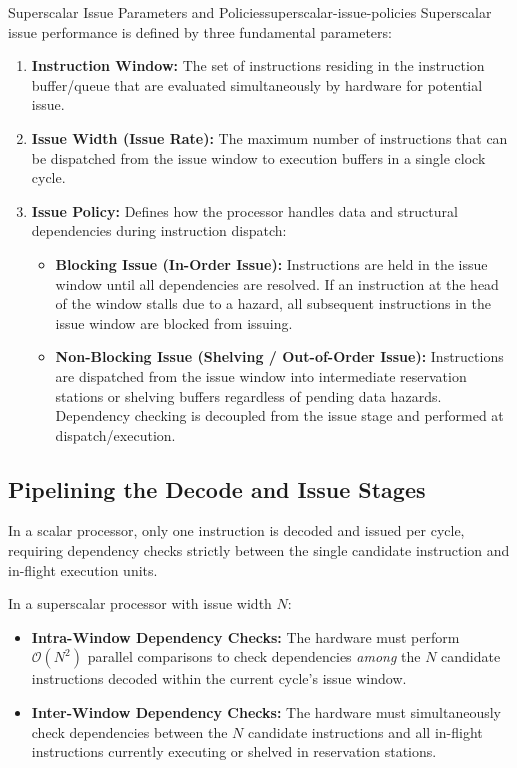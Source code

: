 \begin{concept}{Superscalar Issue Parameters and Policies}{superscalar-issue-policies}
Superscalar issue performance is defined by three fundamental parameters:
\begin{enumerate}
    \item \textbf{Instruction Window:} The set of instructions residing in the instruction buffer/queue that are evaluated simultaneously by hardware for potential issue.
    \item \textbf{Issue Width (Issue Rate):} The maximum number of instructions that can be dispatched from the issue window to execution buffers in a single clock cycle.
    \item \textbf{Issue Policy:} Defines how the processor handles data and structural dependencies during instruction dispatch:
    \begin{itemize}
        \item \textbf{Blocking Issue (In-Order Issue):} Instructions are held in the issue window until all dependencies are resolved. If an instruction at the head of the window stalls due to a hazard, all subsequent instructions in the issue window are blocked from issuing.
        \item \textbf{Non-Blocking Issue (Shelving / Out-of-Order Issue):} Instructions are dispatched from the issue window into intermediate reservation stations or shelving buffers regardless of pending data hazards. Dependency checking is decoupled from the issue stage and performed at dispatch/execution.
    \end{itemize}
\end{enumerate}
\end{concept}

\subsection{Pipelining the Decode and Issue Stages}
In a scalar processor, only one instruction is decoded and issued per cycle, requiring dependency checks strictly between the single candidate instruction and in-flight execution units. 

In a superscalar processor with issue width $N$:
\begin{itemize}
    \item \textbf{Intra-Window Dependency Checks:} The hardware must perform $\mathcal{O}(N^2)$ parallel comparisons to check dependencies \textit{among} the $N$ candidate instructions decoded within the current cycle's issue window.
    \item \textbf{Inter-Window Dependency Checks:} The hardware must simultaneously check dependencies between the $N$ candidate instructions and all in-flight instructions currently executing or shelved in reservation stations.
\end{itemize}

